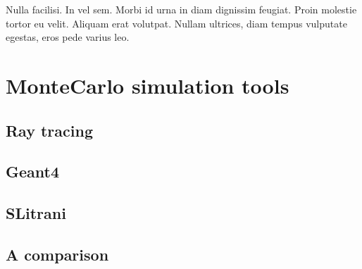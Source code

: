 \begin{savequote}[75mm] 
Nulla facilisi. In vel sem. Morbi id urna in diam dignissim feugiat. Proin molestie tortor eu velit. Aliquam erat volutpat. Nullam ultrices, diam tempus vulputate egestas, eros pede varius leo.
\end{savequote}

\chapter{MonteCarlo simulation tools}


\section{Ray tracing}

\section{Geant4}

\section{SLitrani}

\section{A comparison}